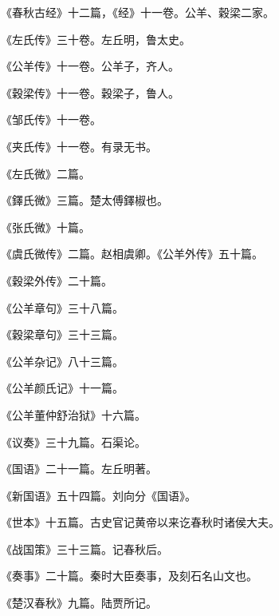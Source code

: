 \documentclass[12pt,UTF8]{ctexbook}
\begin{document}
《春秋古经》十二篇，《经》十一卷。公羊、穀梁二家。



《左氏传》三十卷。左丘明，鲁太史。



《公羊传》十一卷。公羊子，齐人。



《穀梁传》十一卷。穀梁子，鲁人。



《邹氏传》十一卷。



《夹氏传》十一卷。有录无书。



《左氏微》二篇。



《鐸氏微》三篇。楚太傅鐸椒也。



《张氏微》十篇。



《虞氏微传》二篇。赵相虞卿。《公羊外传》五十篇。



《穀梁外传》二十篇。



《公羊章句》三十八篇。



《穀梁章句》三十三篇。



《公羊杂记》八十三篇。



《公羊颜氏记》十一篇。



《公羊董仲舒治狱》十六篇。



《议奏》三十九篇。石渠论。



《国语》二十一篇。左丘明著。



《新国语》五十四篇。刘向分《国语》。



《世本》十五篇。古史官记黄帝以来讫春秋时诸侯大夫。



《战国策》三十三篇。记春秋后。



《奏事》二十篇。秦时大臣奏事，及刻石名山文也。



《楚汉春秋》九篇。陆贾所记。
\end{document}
